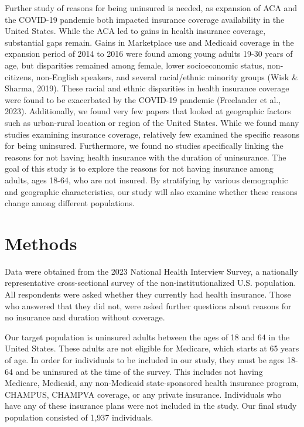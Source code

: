 \documentclass[12pt]{article}
\begin{document}
Further study of reasons for being uninsured is needed, as expansion of ACA and the COVID-19 pandemic both impacted insurance coverage availability in the United States. While the ACA led to gains in health insurance coverage, substantial gaps remain. Gains in Marketplace use and Medicaid coverage in the expansion period of 2014 to 2016 were found among young adults 19-30 years of age, but disparities remained among female, lower socioeconomic status, non-citizens, non-English speakers, and several racial/ethnic minority groups (Wisk \& Sharma, 2019). These racial and ethnic disparities in health insurance coverage were found to be exacerbated by the COVID-19 pandemic (Freelander et al., 2023). Additionally, we found very few papers that looked at geographic factors such as urban-rural location or region of the United States. While we found many studies examining insurance coverage, relatively few examined the specific reasons for being uninsured. Furthermore, we found no studies specifically linking the reasons for not having health insurance with the duration of uninsurance. The goal of this study is to explore the reasons for not having insurance among adults, ages 18-64, who are not insured. By stratifying by various demographic and geographic characteristics, our study will also examine whether these reasons change among different populations.


\newpage
\section{Methods}

Data were obtained from the 2023 National Health Interview Survey, a nationally representative cross-sectional survey of the non-institutionalized U.S. population. All respondents were asked whether they currently had health insurance. Those who answered that they did not, were asked further questions about reasons for no insurance and duration without coverage.

Our target population is uninsured adults between the ages of 18 and 64 in the United States. These adults are not eligible for Medicare, which starts at 65 years of age. In order for individuals to be included in our study, they must be ages 18-64 and be uninsured at the time of the survey. This includes not having Medicare, Medicaid, any non-Medicaid state-sponsored health insurance program, CHAMPUS, CHAMPVA coverage, or any private insurance. Individuals who have any of these insurance plans were not included in the study. Our final study population consisted of 1,937 individuals.
\end{document}
